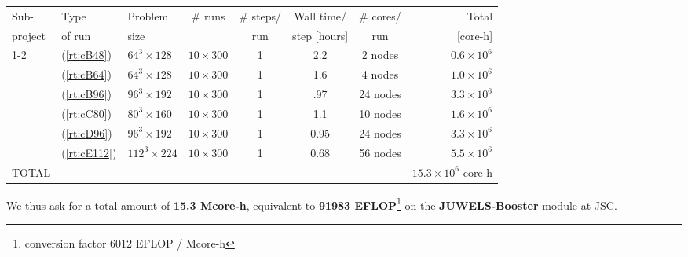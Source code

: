 \begin{center}
	{\small
		\begin{tabular}{lllccccr} \hline\hline
			Sub-         &
			Type         &
			Problem      &
			\# runs      &
			\# steps/    &
			Wall time/   &
			\# cores/    &
			Total                                                                                                               \\
			project      &
			of run       &
			size         &
			             &
			run          &
			step [hours] &
			run          &
			[core-h]                                                                                                            \\
			\hline\hline
			1-2          & (\ref{rt:cB48})  & $64^3\times 128$  & $10\times 300$ & 1 & 2.2  & 2 nodes  & $0.6 \times 10^6$      \\
			             & (\ref{rt:cB64})  & $64^3\times 128$  & $10\times 300$ & 1 & 1.6 & 4 nodes  & $1.0 \times 10^6$      \\
			             & (\ref{rt:cB96})  & $96^3\times 192$  & $10\times 300$ & 1 & .97 & 24 nodes & $3.3 \times 10^6$      \\
			             & (\ref{rt:cC80})  & $80^3\times 160$  & $10\times 300$ & 1 & 1.1 & 10 nodes & $1.6 \times 10^6$      \\
			             & (\ref{rt:cD96})  & $96^3\times 192$  & $10\times 300$ & 1 & 0.95 & 24 nodes & $3.3 \times 10^6$      \\
			             & (\ref{rt:cE112}) & $112^3\times 224$ & $10\times 300$ & 1 & 0.68 & 56 nodes & $5.5 \times 10^6$      \\
			\hline\hline
			TOTAL        &                  &                   &                &   &      &          & $15.3\times 10^6$ core-h \\
		\end{tabular}
	}
\end{center}
\bigskip
We thus ask for a total amount of \textbf{15.3 Mcore-h}, equivalent to \textbf{91983 EFLOP}\footnote{conversion factor 6012 EFLOP / Mcore-h}  on the \textbf{JUWELS-Booster} module at JSC.

